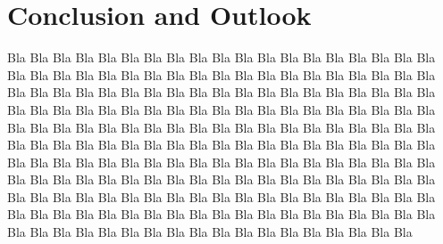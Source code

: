 %
%
%
%
%
%
%
%
%

\chapter{Conclusion and Outlook}
\label{conclusion}

Bla Bla Bla Bla Bla Bla Bla Bla Bla Bla Bla Bla Bla Bla Bla Bla Bla Bla Bla Bla
Bla Bla Bla Bla Bla Bla Bla Bla Bla Bla Bla Bla Bla Bla Bla Bla Bla Bla Bla Bla
Bla Bla Bla Bla Bla Bla Bla Bla Bla Bla Bla Bla Bla Bla Bla Bla Bla Bla Bla Bla
Bla Bla Bla Bla Bla Bla Bla Bla Bla Bla Bla Bla Bla Bla Bla Bla Bla Bla Bla Bla
Bla Bla Bla Bla Bla Bla Bla Bla Bla Bla Bla Bla Bla Bla Bla Bla Bla Bla Bla Bla
Bla Bla Bla Bla Bla Bla Bla Bla Bla Bla Bla Bla Bla Bla Bla Bla Bla Bla Bla Bla
Bla Bla Bla Bla Bla Bla Bla Bla Bla Bla Bla Bla Bla Bla Bla Bla Bla Bla Bla Bla
Bla Bla Bla Bla Bla Bla Bla Bla Bla Bla Bla Bla Bla Bla Bla Bla Bla Bla Bla Bla
Bla Bla Bla Bla Bla Bla Bla Bla Bla Bla Bla Bla Bla Bla Bla Bla Bla Bla Bla Bla
Bla Bla Bla Bla Bla Bla Bla Bla Bla Bla Bla Bla Bla Bla Bla Bla Bla Bla Bla Bla
Bla Bla Bla Bla Bla Bla Bla Bla

%
%
